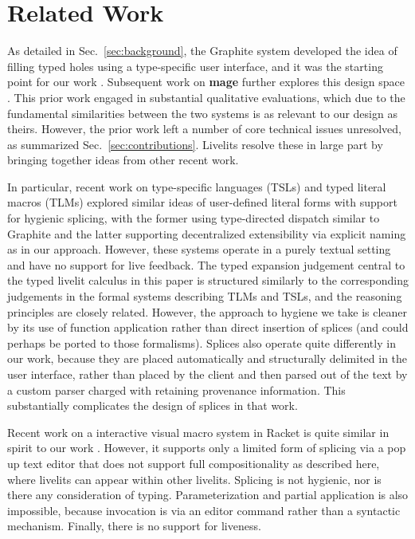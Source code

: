 \section{Related Work}\label{sec:related-work}
As detailed in Sec.~\ref{sec:background},
the Graphite system developed the idea of filling 
typed holes using a type-specific user interface, and it was the starting 
point for our work \cite{Graphite}.
Subsequent work on \textbf{mage} further explores this design space \cite{DBLP:conf/uist/KeryRHMWP20}.
This prior work engaged in substantial qualitative evaluations, 
which due to the fundamental similarities between the two systems 
is as relevant to our design as theirs. However, the prior work 
left a number of core technical issues unresolved,
as summarized Sec.~\ref{sec:contributions}.
Livelits resolve these in large part by bringing together  ideas from other recent work.

In particular, recent work on type-specific languages (TSLs) \cite{TSLs} 
and typed literal macros (TLMs) \cite{TLMs}
explored similar ideas of user-defined
literal forms with support for hygienic splicing, with the former 
using type-directed dispatch similar to Graphite and the latter supporting 
decentralized extensibility via explicit naming as in our approach. 
However, these systems operate in a purely 
textual setting and have no support for live feedback.
The typed expansion judgement central to the typed livelit calculus in this paper 
is structured similarly 
to the corresponding judgements in the formal systems describing TLMs and TSLs,
and the reasoning principles are closely related. However, the  
approach to hygiene we take is cleaner by its use of function application 
rather than direct insertion of splices (and could perhaps be ported to those formalisms).
Splices also operate quite differently in our work,
because they are placed automatically and structurally delimited in the user interface, rather than 
placed by the client and then parsed out of the text by a custom parser charged 
with retaining provenance information.
This substantially complicates the design of splices in that work.

Recent work on a interactive visual macro system in Racket 
is quite similar in spirit to our work \cite{interactive-visual-syntax}.
However, it supports only a limited form of splicing via a pop up text editor
that does not support full compositionality as described here, where livelits 
can appear within other livelits. Splicing is not hygienic, nor is there any 
consideration of typing. Parameterization and partial application is also impossible, because invocation 
is via an editor command rather than a syntactic mechanism. Finally,
there is no support for liveness. 

